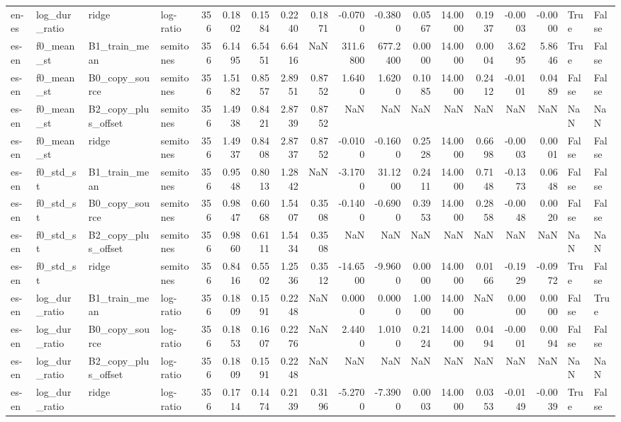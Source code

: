 \begin{tabular}{llllrrrrrrrrrrrrll}
en-es & log_dur_ratio & ridge & log-ratio & 356 & 0.1802 & 0.1584 & 0.2240 & 0.1871 & -0.0700 & -0.3800 & 0.0567 & 14.0000 & 0.1937 & -0.0003 & -0.0000 & True & False \\
es-en & f0_mean_st & B1_train_mean & semitones & 356 & 6.1495 & 6.5451 & 6.6416 & NaN & 311.6800 & 677.2400 & 0.0000 & 14.0000 & 0.0004 & 3.6295 & 5.8646 & True & False \\
es-en & f0_mean_st & B0_copy_source & semitones & 356 & 1.5182 & 0.8557 & 2.8951 & 0.8752 & 1.6400 & 1.6200 & 0.1085 & 14.0000 & 0.2412 & -0.0101 & 0.0489 & False & False \\
es-en & f0_mean_st & B2_copy_plus_offset & semitones & 356 & 1.4938 & 0.8421 & 2.8739 & 0.8752 & NaN & NaN & NaN & NaN & NaN & NaN & NaN & NaN & NaN \\
es-en & f0_mean_st & ridge & semitones & 356 & 1.4937 & 0.8408 & 2.8737 & 0.8752 & -0.0100 & -0.1600 & 0.2528 & 14.0000 & 0.6698 & -0.0003 & 0.0001 & False & False \\
es-en & f0_std_st & B1_train_mean & semitones & 356 & 0.9548 & 0.8013 & 1.2842 & NaN & -3.1700 & 31.1200 & 0.2411 & 14.0000 & 0.7148 & -0.1373 & 0.0648 & False & False \\
es-en & f0_std_st & B0_copy_source & semitones & 356 & 0.9847 & 0.6068 & 1.5407 & 0.3508 & -0.1400 & -0.6900 & 0.3953 & 14.0000 & 0.2858 & -0.0048 & 0.0020 & False & False \\
es-en & f0_std_st & B2_copy_plus_offset & semitones & 356 & 0.9860 & 0.6111 & 1.5434 & 0.3508 & NaN & NaN & NaN & NaN & NaN & NaN & NaN & NaN & NaN \\
es-en & f0_std_st & ridge & semitones & 356 & 0.8416 & 0.5502 & 1.2536 & 0.3512 & -14.6500 & -9.9600 & 0.0000 & 14.0000 & 0.0166 & -0.1929 & -0.0972 & True & False \\
es-en & log_dur_ratio & B1_train_mean & log-ratio & 356 & 0.1809 & 0.1591 & 0.2248 & NaN & 0.0000 & 0.0000 & 1.0000 & 14.0000 & NaN & 0.0000 & 0.0000 & False & True \\
es-en & log_dur_ratio & B0_copy_source & log-ratio & 356 & 0.1853 & 0.1607 & 0.2276 & NaN & 2.4400 & 1.0100 & 0.2124 & 14.0000 & 0.0494 & -0.0001 & 0.0094 & False & False \\
es-en & log_dur_ratio & B2_copy_plus_offset & log-ratio & 356 & 0.1809 & 0.1591 & 0.2248 & NaN & NaN & NaN & NaN & NaN & NaN & NaN & NaN & NaN & NaN \\
es-en & log_dur_ratio & ridge & log-ratio & 356 & 0.1714 & 0.1474 & 0.2139 & 0.3196 & -5.2700 & -7.3900 & 0.0003 & 14.0000 & 0.0353 & -0.0149 & -0.0039 & True & False \\
\bottomrule
\end{tabular}
